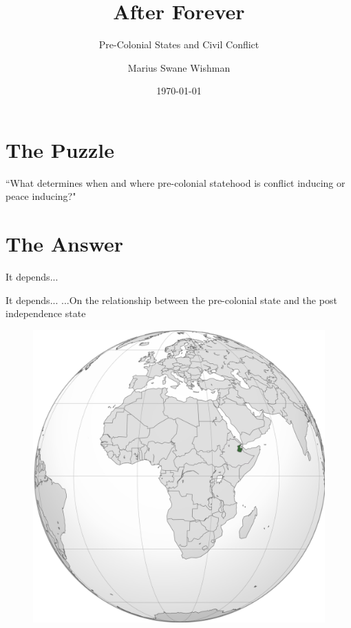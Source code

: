 \documentclass{beamer}
\title[ISA 2023]{After Forever}
\subtitle{Pre-Colonial States and Civil Conflict}
\author[Wishman]{Marius Swane Wishman}
\date{\today}
\institute{NTNU}
\begin{document}
\begin{frame}[plain]
\titlepage 
\end{frame}

\section{The Puzzle}


\begin{frame} 
	\centering
	\Large ``What determines when and where pre-colonial
	statehood is conflict inducing or peace inducing?"

\end{frame}

\section{The Answer}

\begin{frame} 
	\centering
	\Large It depends...
\end{frame}

\begin{frame}{It depends...}
	\centering
	\Large ...On the relationship between the pre-colonial state and the
	post independence state
\end{frame}

\begin{frame}
	\begin{figure}
		\includegraphics[width=.7\linewidth]{img/aussa.png}
	\end{figure}
\end{frame}
\end{document}

